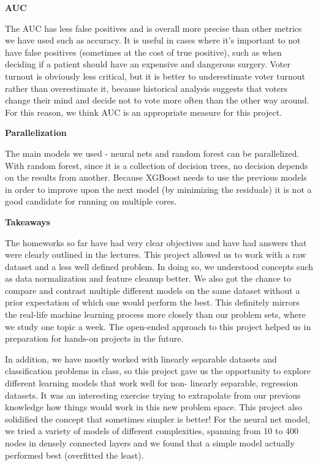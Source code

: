 \vspace{-2ex}

\vspace{1ex}
\noindent
\textbf{AUC}

\noindent
The AUC has less false positives and is overall more precise than other metrics we have used such as accuracy. It is useful in cases where it’s important to not have false positives (sometimes at the cost of true positive), such as when deciding if a patient should have an expensive and dangerous surgery. Voter turnout is obviously less critical, but it is better to underestimate voter turnout rather than overestimate it, because historical analysis suggests that voters change their mind and decide not to vote more often than the other way around. For this reason, we think AUC is an appropriate measure for this project.

\vspace{1ex}
\noindent
\textbf{Parallelization}

\noindent
The main models we used - neural nets and random forest can be parallelized. With random forest, since it is a collection of decision trees, no decision depends on the results from another. Because XGBoost needs to use the previous models in order to improve upon the next model (by minimizing the residuals) it is not a good candidate for running on multiple cores.

\vspace{1ex}
\noindent
\textbf{Takeaways}

\noindent
The homeworks so far have had very clear objectives and have had answers that were clearly outlined in the lectures. This project allowed us to work with a raw dataset and a less well defined problem. In doing so, we understood concepts such as data normalization and feature cleanup better. We also got the chance to compare and contrast multiple different models on the same dataset without a prior expectation of which one would perform the best. This definitely mirrors the real-life machine learning process more closely than our problem sets, where we study one topic a week. The open-ended approach to this project helped us in preparation for hands-on projects in the future.

\noindent
In addition, we have mostly worked with linearly separable datasets and classification problems in class, so this project gave us the opportunity to explore different learning models that work well for non- linearly separable, regression datasets. It was an interesting exercise trying to extrapolate from our previous knowledge how things would work in this new problem space.
This project also solidified the concept that sometimes simpler is better! For the neural net model, we tried a variety of models of different complexities, spanning from 10 to 400 nodes in densely connected layers and we found that a simple model actually performed best (overfitted the least).

